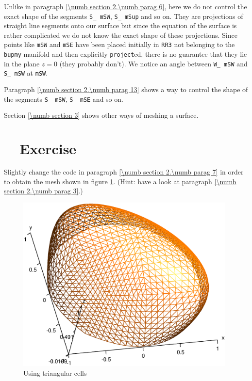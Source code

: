 Unlike in paragraph \ref{\numb section 2.\numb parag 6}, here we do not control the
exact shape of the segments {\small\tt S\_\,mSW}, {\small\tt S\_\,mSup} and so on.
They are projections of straight line segments onto our surface but since the equation
of the surface is rather complicated we do not know the exact shape of these projections.
Since points like {\small\tt mSW} and {\small\tt mSE} have been placed initially in
{\small\tt RR3} not belonging to the {\small\tt bupmy} manifold and then explicitly
{\small\tt project}ed,
there is no guarantee that they lie in the plane $ z = 0 $ (they probably don't).
We notice an angle between {\small\tt W\_\,mSW} and {\small\tt S\_\,mSW} at {\small\tt mSW}.

Paragraph \ref{\numb section 2.\numb parag 13} shows a way to control the shape of the segments
{\small\tt S\_\,mSW}, {\small\tt S\_\,mSE} and so on.

Section \ref{\numb section 3} shows other ways of meshing a surface.


\section{~~Exercise}\label{\numb section 2.\numb parag 8}

Slightly change the code in paragraph \ref{\numb section 2.\numb parag 7}
in order to obtain the mesh shown in figure \ref{\numb section 2.\numb fig 8}.
(Hint: have a look at paragraph \ref{\numb section 2.\numb parag 3}.)

\begin{figure}[ht] \centering
  \includegraphics[width=110mm]{hemisphere-1}
  \caption{Using triangular cells}
  \label{\numb section 2.\numb fig 8}
\end{figure}


